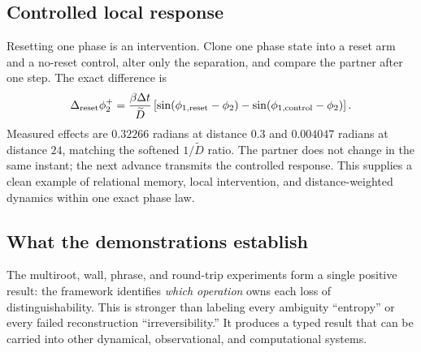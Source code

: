 \subsection{Controlled local response}

Resetting one phase is an intervention. Clone one phase state into a reset arm and a no-reset control, alter only the separation, and compare the partner after one step. The exact difference is
\begin{equation}
\Delta_{\rm reset}\phi_2^+
=
\frac{\beta\Delta t}{\widetilde D}
\left[
\sin(\phi_{1,\rm reset}-\phi_2)
-
\sin(\phi_{1,\rm control}-\phi_2)
\right].
\label{eq:reset-response}
\end{equation}
Measured effects are \(0.32266\) radians at distance \(0.3\) and \(0.004047\) radians at distance \(24\), matching the softened \(1/\widetilde D\) ratio. The partner does not change in the same instant; the next advance transmits the controlled response. This supplies a clean example of relational memory, local intervention, and distance-weighted dynamics within one exact phase law.

\subsection{What the demonstrations establish}

The multiroot, wall, phrase, and round-trip experiments form a single positive result: the framework identifies \emph{which operation} owns each loss of distinguishability. This is stronger than labeling every ambiguity ``entropy'' or every failed reconstruction ``irreversibility.'' It produces a typed result that can be carried into other dynamical, observational, and computational systems.
